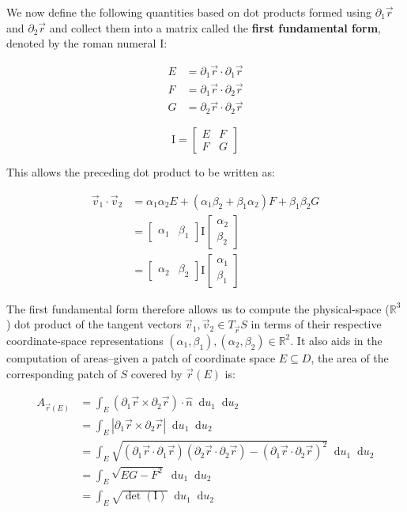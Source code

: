 \documentclass{article}
\newcommand*\diff{\mathop{}\!\mathrm{d}}
\begin{document}
We now define the following quantities based on dot products formed using $\partial_1 {\vec{r}}$ and $\partial_2 {\vec{r}}$ and collect them into a matrix called the \textbf{first fundamental form}, denoted by the roman numeral $\mathrm{I}$:

\begin{align}
  E &= \partial_1 \vec{r} \cdot \partial_1 \vec{r} \\
  F &= \partial_1 \vec{r} \cdot \partial_2 \vec{r} \\
  G &= \partial_2 \vec{r} \cdot \partial_2 \vec{r}
\end{align}

\begin{equation}
  \mathrm{I} =
  \begin{bmatrix} E & F \\ F & G
  \end{bmatrix}
\end{equation}

This allows the preceding dot product to be written as:

\begin{align*}
  \vec{v}_1 \cdot \vec{v}_2 &= \alpha_1 \alpha_2 E + (\alpha_1 \beta_2 + \beta_1 \alpha_2) F + \beta_1 \beta_2 G \\
  &=
  \begin{bmatrix} \alpha_1 & \beta_1
  \end{bmatrix}
  \mathrm{I}
  \begin{bmatrix} \alpha_2 \\ \beta_2
  \end{bmatrix} \\
  &=
  \begin{bmatrix} \alpha_2 & \beta_2
  \end{bmatrix}
  \mathrm{I}
  \begin{bmatrix} \alpha_1 \\ \beta_1
  \end{bmatrix}
\end{align*}

The first fundamental form therefore allows us to compute the physical-space ($\mathbb{R}^3$) dot product of the tangent vectors $\vec{v}_1, \vec{v}_2 \in T_{\vec{r}}S$ in terms of their respective coordinate-space representations $(\alpha_1, \beta_1), (\alpha_2, \beta_2) \in \mathbb{R}^2$. It also aids in the computation of areas--given a patch of coordinate space $E \subseteq D$, the area of the corresponding patch of $S$ covered by $\vec{r}(E)$ is:

\begin{align*}
  A_{\vec{r}(E)} &= \int_E (\partial_1 \vec{r} \times \partial_2 \vec{r}) \cdot \hat{n} \diff{u_1} \diff{u_2} \\
  &= \int_E |\partial_1 \vec{r} \times \partial_2 \vec{r}| \diff{u_1} \diff{u_2} \\
  &= \int_E \sqrt{(\partial_1 \vec{r} \cdot \partial_1 \vec{r})(\partial_2 \vec{r} \cdot \partial_2 \vec{r}) - (\partial_1 \vec{r} \cdot \partial_2 \vec{r})^2} \diff{u_1} \diff{u_2} \\
  &= \int_E \sqrt{EG - F^2} \diff{u_1} \diff{u_2} \\
  &= \int_E \sqrt{\det(\mathrm{I})} \diff{u_1} \diff{u_2}
\end{align*}
\end{document}
